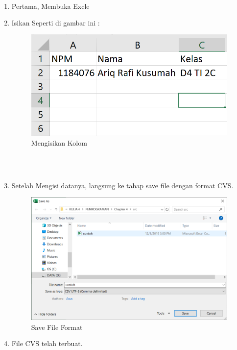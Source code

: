 \documentclass[12pt, times new roman]{report}
\begin{document}
\begin{enumerate}
    \item Pertama, Membuka Excle 
    \item Isikan Seperti di gambar ini :
    \begin{figure}[h]
        \centering
        \includegraphics[scale=0.7]{figures/Make1.PNG}
        \caption{Mengisikan Kolom}
        \label{fig:my_label}
    \end{figure}
    \\
    \\
    \item Setelah Mengisi datanya, langsung ke tahap save file dengan format CVS.
    \begin{figure}[ht]
        \centering
        \includegraphics[scale=0.5]{figures/Make2.PNG}
        \caption{Save File Format}
        \label{fig:my_label}
    \end{figure}
    \item File CVS telah terbuat.
\end{enumerate}

\newpage
\end{document}
